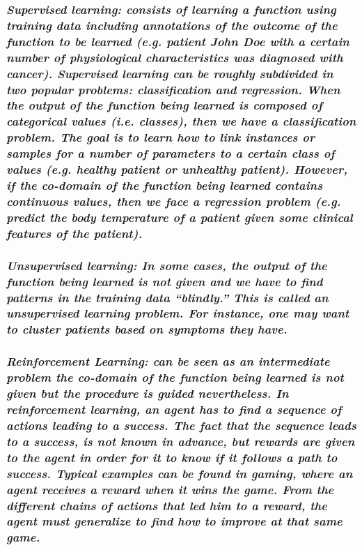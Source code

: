 \subsubsection{\emph{Supervised learning: consists of learning a function using
training data including annotations of the outcome of the function to be learned
(e.g. patient John Doe with a certain number of physiological characteristics
was diagnosed with cancer). Supervised learning can be roughly subdivided in two
popular problems:
\emph{classification} and \emph{regression}. When the output of the function
being learned is composed of categorical values (i.e. classes), then we have a
classification problem. The goal is to learn how to link instances or samples
for a number of parameters to a certain class of values (e.g. healthy patient or
unhealthy patient). However, if the co-domain of the function being learned
contains continuous values, then we face a regression problem (e.g. predict the
body temperature of a patient given some clinical features of the patient).}}

\subsubsection{\emph{Unsupervised learning: In some cases, the output of the
function being learned is not given and we have to find patterns in the training data ``blindly.'' This is called an
\emph{unsupervised} learning problem. For instance, one may want to cluster
patients based on symptoms they have.}}

\subsubsection{\emph{Reinforcement Learning: can be seen as an intermediate
problem the co-domain of the function being learned is not given but the procedure is guided
nevertheless. In reinforcement learning, an agent has to find a sequence of
actions leading to a success. The fact that the sequence leads to a success, is
not known in advance, but rewards are given to the agent in order for it to know
if it follows a path to success. Typical examples can be found in gaming, where
an agent receives a reward when it wins the game. From the different chains of
actions that led him to a reward, the agent must generalize to find how to
improve at that same game.}}